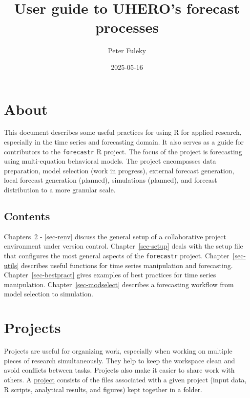 \documentclass[
  letterpaper,
  DIV=11,
  numbers=noendperiod]{scrreport}
\title{User guide to UHERO's forecast processes}
\author{Peter Fuleky}
\date{2025-05-16}
\renewcommand*\contentsname{Table of contents}
\newcommand\contentsname{Table of contents}
\begin{document}
\maketitle

\renewcommand*\contentsname{Table of contents}
{
\hypersetup{linkcolor=}
\setcounter{tocdepth}{2}
\tableofcontents
}


\chapter{About}\label{about}

This document describes some useful practices for using R for applied
research, especially in the time series and forecasting domain. It also
serves as a guide for contributors to the \texttt{forecastr} R project.
The focus of the project is forecasting using multi-equation behavioral
models. The project encompasses data preparation, model selection (work
in progress), external forecast generation, local forecast generation
(planned), simulations (planned), and forecast distribution to a more
granular scale.

\section{Contents}\label{contents}

Chapters~\ref{sec-projects} - \ref{sec-renv} discuss the general setup
of a collaborative project environment under version control.
Chapter~\ref{sec-setup} deals with the setup file that configures the
most general aspects of the \texttt{forecastr} project.
Chapter~\ref{sec-utils} describes useful functions for time series
manipulation and forecasting. Chapter~\ref{sec-bestpract} gives examples
of best practices for time series manipulation.
Chapter~\ref{sec-modselect} describes a forecasting workflow from model
selection to simulation.


\chapter{Projects}\label{sec-projects}

Projects are useful for organizing work, especially when working on
multiple pieces of research simultaneously. They help to keep the
workspace clean and avoid conflicts between tasks. Projects also make it
easier to share work with others. A
\href{https://support.posit.co/hc/en-us/articles/200526207-Using-RStudio-Projects}{project}
consists of the files associated with a given project (input data, R
scripts, analytical results, and figures) kept together in a folder.
\end{document}
